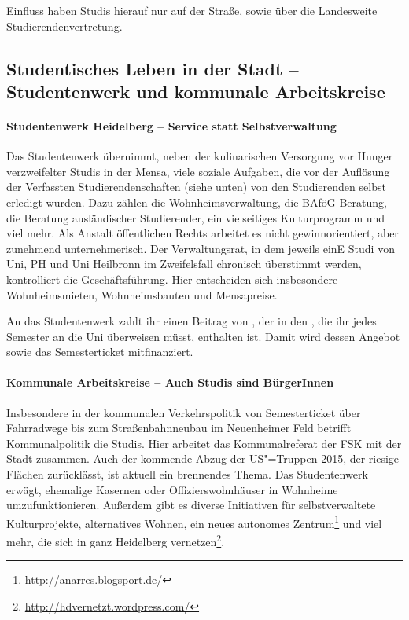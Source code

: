 Einfluss haben Studis hierauf nur auf der Straße, sowie über die Landesweite Studierendenvertretung.


\subsection{Studentisches Leben in der Stadt -- Studentenwerk und kommunale Arbeitskreise}

\paragraph{Studentenwerk Heidelberg -- Service statt Selbstverwaltung}

Das Studentenwerk übernimmt, neben der kulinarischen Versorgung vor Hunger verzweifelter Studis in der Mensa, viele soziale Aufgaben, die vor der Auflösung der Verfassten Studierendenschaften (siehe unten) von den Studierenden selbst erledigt wurden. Dazu zählen die Wohnheimsverwaltung, die BAföG-Beratung, die Beratung ausländischer Studierender, ein vielseitiges Kulturprogramm und viel mehr. Als Anstalt öffentlichen Rechts arbeitet es nicht gewinnorientiert, aber zunehmend unternehmerisch. Der Verwaltungsrat, in dem jeweils einE Studi von Uni, PH und Uni Heilbronn im Zweifelsfall chronisch überstimmt werden, kontrolliert die Geschäftsführung. Hier entscheiden sich insbesondere Wohnheimsmieten, Wohnheimsbauten und Mensapreise.

An das Studentenwerk zahlt ihr einen Beitrag von \EUR{\studentenwerksbeitrag}, der in den \EUR{\beitragssumme}, die ihr jedes Semester an die Uni überweisen müsst, enthalten ist. Damit wird dessen Angebot sowie das Semesterticket mitfinanziert.

\paragraph{Kommunale Arbeitskreise -- Auch Studis sind BürgerInnen}

Insbesondere in der kommunalen Verkehrspolitik von Semesterticket über Fahrradwege bis zum Straßenbahnneubau im Neuenheimer Feld betrifft Kommunalpolitik die Studis. Hier arbeitet das Kommunalreferat der \gls{FSK} mit der Stadt zusammen. Auch der kommende Abzug der US"=Truppen 2015, der riesige Flächen zurücklässt, ist aktuell ein brennendes Thema. Das Studentenwerk erwägt, ehemalige Kasernen oder Offizierswohnhäuser in Wohnheime umzufunktionieren. Außerdem gibt es diverse Initiativen für selbstverwaltete Kulturprojekte, alternatives Wohnen, ein neues autonomes Zentrum\footnote{\url{http://anarres.blogsport.de/}} und viel mehr, die sich in ganz Heidelberg vernetzen\footnote{\url{http://hdvernetzt.wordpress.com/}}.


